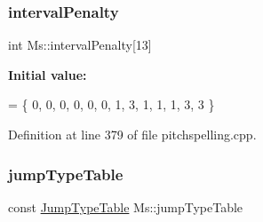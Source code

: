 \subsubsection{\texorpdfstring{interval\+Penalty}{intervalPenalty}}
{\footnotesize\ttfamily int Ms\+::interval\+Penalty\mbox{[}13\mbox{]}}

{\bfseries Initial value\+:}
\begin{DoxyCode}
= \{
      0, 0, 0, 0, 0, 0, 1, 3, 1, 1, 1, 3, 3
      \}
\end{DoxyCode}


Definition at line 379 of file pitchspelling.\+cpp.

\mbox{\label{namespace_ms_a26313335fe113008a12efbaf2bdd5a30}} 
\subsubsection{\texorpdfstring{jump\+Type\+Table}{jumpTypeTable}}
{\footnotesize\ttfamily const \hyperlink{struct_ms_1_1_jump_type_table}{Jump\+Type\+Table} Ms\+::jump\+Type\+Table}

